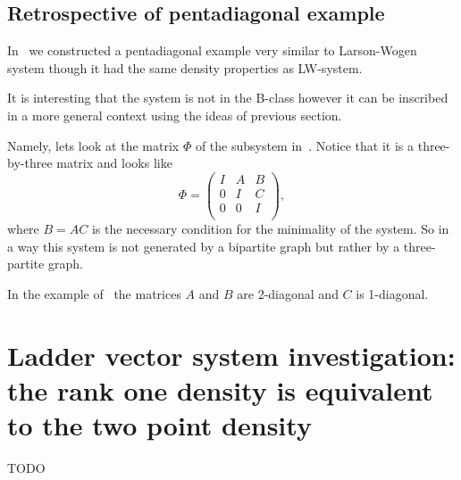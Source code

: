 \documentclass[12pt]{amsart}
\theoremstyle{case}
\begin{document}
  \subsection{Retrospective of pentadiagonal example}
    In~\cite{me2} we constructed a pentadiagonal example very similar to Larson-Wogen system though
      it had the same density properties as LW-system.

    It is interesting that the system is not in the B-class however it can be inscribed in a more
      general context using the ideas of previous section.

    Namely, lets look at the matrix $\Phi$ of the subsystem in~\cite{me2}.
    Notice that it is a three-by-three matrix and looks like
    \[
      \Phi = \left( {
        \begin{array}{ccc}
           I & A & B\\
           0 & I & C\\
           0 & 0 & I\\
        \end{array}
        }
      \right),
    \]
    where $B = AC$ is the necessary condition for the minimality of the system.
    So in a way this system is not generated by a bipartite graph but rather by a three-partite graph.

    In the example of~\cite{me2} the matrices $A$ and $B$ are 2-diagonal and $C$ is 1-diagonal.

\section{Ladder vector system investigation: the rank one density is equivalent to the two point density}
  TODO


\end{document}
